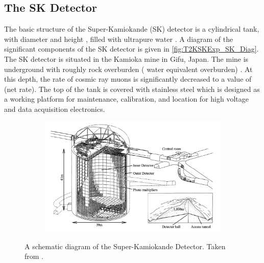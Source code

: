 \subsection{The SK Detector}
\label{subsec:T2KSKExp_SKDetector}

The basic structure of the Super-Kamiokande (SK) detector is a cylindrical tank, with diameter  and height , filled with ultrapure water \cite{Abe_2014_SKCalib}. A diagram of the significant components of the SK detector is given in \autoref{fig:T2KSKExp_SK_Diag}. The SK detector is situated in the Kamioka mine in Gifu, Japan. The mine is underground with roughly  rock overburden ( water equivalent overburden) \cite{Fukuda2003-ly}. At this depth, the rate of cosmic ray muons is significantly decreased to a value of  (net rate). The top of the tank is covered with stainless steel which is designed as a working platform for maintenance, calibration, and location for high voltage and data acquisition electronics.

\begin{figure}[h]
  \begin{subfigure}[t]{0.95\textwidth}
    \includegraphics[width=\textwidth, trim={0mm 0mm 0mm 0mm}, clip,page=1]{Figures/Detectors/SKDiagram.pdf}
  \end{subfigure}
  \caption{A schematic diagram of the Super-Kamiokande Detector. Taken from \cite{Itow2001-bc}.}
  \label{fig:T2KSKExp_SK_Diag}
\end{figure}

